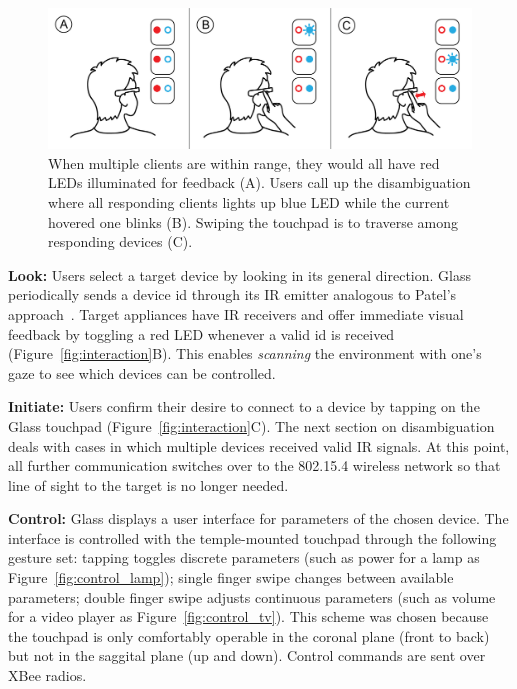 \begin{figure}[t!]
\centering
\includegraphics[width=\columnwidth]{figures/stepbystep_multi.png}
\caption{When multiple clients are within range, they would all have red LEDs illuminated for feedback (A). Users call up the disambiguation where all responding clients lights up blue LED while the current hovered one blinks (B). Swiping the touchpad is to traverse among responding devices (C).}
\label{fig:interaction_multi}
\end{figure}

{\bf Look:} Users select a target device by looking in its general direction.
Glass periodically sends a device id through its IR emitter analogous to Patel's approach~\cite{patel_2-way_2003}. Target appliances have IR receivers and offer immediate visual feedback by toggling a red LED whenever a valid id is received (Figure~\ref{fig:interaction}B). This enables {\em scanning} the environment with one's gaze to see which devices can be controlled.

{\bf Initiate:} Users confirm their desire to connect to a device by tapping on the Glass touchpad (Figure~\ref{fig:interaction}C). The next section on disambiguation deals with cases in which multiple devices received valid IR signals. At this point, all further communication switches over to the 802.15.4 wireless network so that line of sight to the target is no longer needed.

{\bf Control:} Glass displays a user interface for parameters of the chosen device. The interface is controlled with the temple-mounted touchpad through the following gesture set: tapping toggles discrete parameters (such as power for a lamp as Figure~\ref{fig:control_lamp}); single finger swipe changes between available parameters; double finger swipe adjusts continuous parameters (such as volume for a video player as Figure~\ref{fig:control_tv}). This scheme was chosen because the touchpad is only comfortably operable in the coronal plane (front to back) but not in the saggital plane (up and down). 
Control commands are sent over XBee radios.

